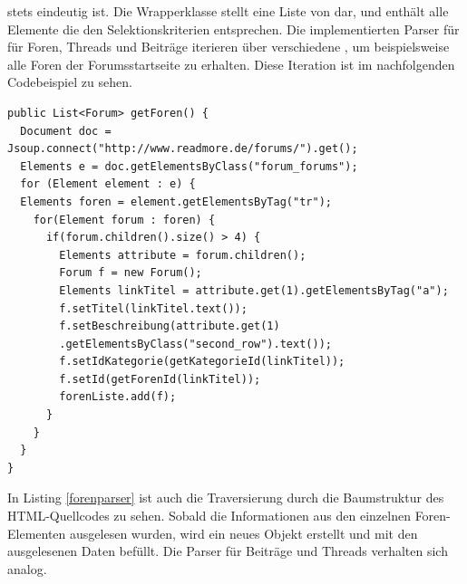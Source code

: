 stets eindeutig ist. Die Wrapperklasse  stellt eine Liste von
 dar, und enthält alle Elemente die den Selektionskriterien
entsprechen. Die implementierten Parser für für Foren, Threads und Beiträge
iterieren über verschiedene , um beispielsweise alle Foren der
Forumsstartseite zu erhalten. Diese Iteration ist im nachfolgenden Codebeispiel
zu sehen.
\begin{lstlisting}[caption=Auslesen der Foren im Forenparser, label=forenparser]
public List<Forum> getForen() {
  Document doc = Jsoup.connect("http://www.readmore.de/forums/").get();
  Elements e = doc.getElementsByClass("forum_forums");
  for (Element element : e) {
  Elements foren = element.getElementsByTag("tr");
    for(Element forum : foren) {
      if(forum.children().size() > 4) {
   	    Elements attribute = forum.children();
	    Forum f = new Forum();
	    Elements linkTitel = attribute.get(1).getElementsByTag("a");
	    f.setTitel(linkTitel.text());
	    f.setBeschreibung(attribute.get(1)
	    .getElementsByClass("second_row").text());
	    f.setIdKategorie(getKategorieId(linkTitel));
	    f.setId(getForenId(linkTitel));
	    forenListe.add(f);
      }
    }
  }
}
\end{lstlisting}
In Listing \ref{forenparser} ist auch die Traversierung durch die Baumstruktur
des HTML-Quellcodes zu sehen. Sobald die Informationen aus den einzelnen
Foren-Elementen ausgelesen wurden, wird ein neues  Objekt erstellt
und mit den ausgelesenen Daten befüllt. Die Parser für Beiträge und Threads
verhalten sich analog.
